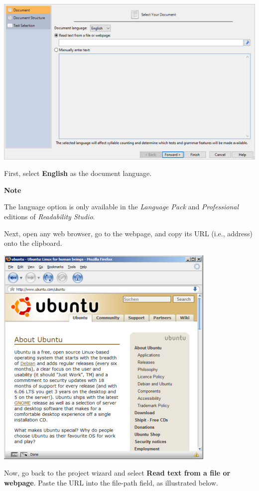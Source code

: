\documentclass[
]{book}
\newenvironment{notesection}
    {
    \begin{tcolorbox}[colframe=mediumblue,colback=lightblue,coltext=mediumblue,arc=3mm]
    \faLightbulb[regular] \textbf{Note} \newline
    }
    {
    \end{tcolorbox}
    }
\theoremstyle{definition}
\theoremstyle{definition}
\theoremstyle{definition}
\theoremstyle{definition}
\theoremstyle{remark}
\begin{document}
\includegraphics{Images/wizard1.png}

First, select \textbf{English} as the document language.

\begin{notesection}
The language option is only available in the \emph{Language Pack} and \emph{Professional} editions of \emph{Readability Studio}.

\end{notesection}

Next, open any web browser, go to the webpage, and copy its URL (i.e., address) onto the clipboard.

\begin{center}\includegraphics[width=0.75\linewidth,]{Images/NonGenerated/webbrowser} \end{center}

Now, go back to the project wizard and select \textbf{Read text from a file or webpage}. Paste the URL into the file-path field, as illustrated below.
\end{document}
